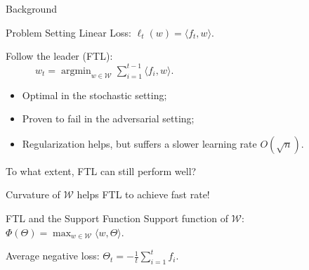 \documentclass[final]{beamer} %
\newcommand{\cW}{\mathcal{W}}
\newcommand{\lt}{\ell_t}
\newcommand{\ip}[1]{\langle#1\rangle}
\DeclareMathOperator*{\argmin}{argmin}
\begin{document}
\begin{frame}[c]
\begin{columns}[t,totalwidth=\textwidth]
\begin{column}{.24\textwidth}
\begin{block}{Background}
		\end{block}
		\begin{block}{Problem Setting}
		{\centering Linear Loss: $\lt(w) = \ip{f_t, w}$}.
		\begin{minipage}{.9\linewidth}
			\begin{block}{}
				\vspace{-2cm}
		 		\begin{tcolorbox}[title filled,colbacktitle=uofagreen!5, coltitle = black, width = 0.9\textwidth, colback = uofagreen!10, colframe = red,arc = 16pt]
			 		Follow the leader (FTL):\\
			 		$\quad \quad \quad w_t = \argmin_{w\in \cW} \sum_{i=1}^{t-1} \ip{f_i,w}.$
		 		\end{tcolorbox}	
			 	\begin{itemize}
			 		\item Optimal in the stochastic setting;
			 		\item Proven to fail in the adversarial setting;
			 		\item Regularization helps, but suffers a slower learning rate $O(\sqrt{n})$.
			 	\end{itemize}
			\end{block}
		\end{minipage}

		 \vspace{1cm}
	 	{\large \alert{To what extent, FTL can still perform well?}}
	 	\vspace{1cm}
	 	\begin{tcolorbox}[title = \vspace{0.4cm}\textbf{\large Our contribution} \vspace{0.4cm}, title filled, width = 0.9\textwidth, colback = uofagreen!10, colframe = red, arc = 16pt]
	 		Curvature of $\cW$ helps FTL to achieve fast rate!
	 	\end{tcolorbox}
		\end{block}

	
		\begin{block}{FTL and the Support Function}
			Support function of $\cW$:
			\qquad $
			\Phi(\Theta) = \max_{w\in\cW} \ip{w, \Theta}.
			$
			\medskip
			
			Average negative loss:
			\qquad \quad$\displaystyle
			\Theta_t = -\frac1t \sum_{i=1}^t f_i.
			$
			

\end{block}
\end{column}
\end{columns}
\end{frame}
\end{document}
